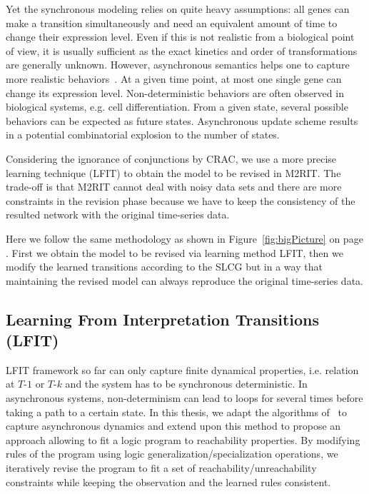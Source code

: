 Yet the synchronous modeling relies on quite heavy assumptions:
all genes can make a transition simultaneously and need an equivalent amount of time to change their expression level.
Even if this is not realistic from a biological point of view, it is usually sufficient as the exact kinetics and order of transformations are generally unknown.
However, asynchronous semantics helps one to capture more realistic behaviors~\cite{bernot2009}.
At a given time point, at most one single gene can change its expression level.
Non-deterministic behaviors are often observed in biological systems, e.g. cell differentiation.
From a given state, several possible behaviors can be expected as future states.
Asynchronous update scheme results in a potential combinatorial explosion to the number of states.

Considering the ignorance of conjunctions by CRAC, we use a more precise learning technique (LFIT) to obtain the model to be revised in M2RIT.
The trade-off is that M2RIT cannot deal with noisy data sets and there are more constraints in the revision phase because we have to keep the consistency of the resulted network with the original time-series data.

Here we follow the same methodology as shown in Figure~\ref{fig:bigPicture} on page \pageref{fig:bigPicture}.
First we obtain the model to be revised via learning method LFIT, then we modify the learned transitions according to the SLCG but in a way that maintaining the revised model can always reproduce the original time-series data.






\subsection{Learning From Interpretation Transitions (LFIT)}\label{sec:lfit}
LFIT framework so far can only capture finite dynamical properties, i.e. relation at $T$-$1$ or $T$-$k$ and the system has to be synchronous deterministic.
In asynchronous systems, non-determinism can lead to loops for several times before taking a path to a certain state.
In this thesis, we adapt the algorithms of~\cite{ribeiro2015learning,DMTRICLP15} to capture asynchronous dynamics and extend upon this method to propose an approach allowing to fit a logic program to reachability properties.
By modifying rules of the program using logic generalization/specialization operations, we iteratively revise the program to fit a set of reachability/unreachability constraints while keeping the observation and the learned rules consistent.

